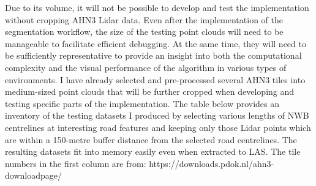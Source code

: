 Due to its volume, it will not be possible to develop and test the implementation without cropping AHN3 Lidar data. Even after the implementation of the segmentation workflow, the size of the testing point clouds will need to be manageable to facilitate efficient debugging. At the same time, they will need to be sufficiently representative to provide an insight into both the computational complexity and the visual performance of the algorithm in various types of environments. I have already selected and pre-processed several AHN3 tiles into medium-sized point clouds that will be further cropped when developing and testing specific parts of the implementation. The table below provides an inventory of the testing datasets I produced by selecting various lengths of NWB centrelines at interesting road features and keeping only those Lidar points which are within a 150-metre buffer distance from the selected road centrelines. The resulting datasets fit into memory easily even when extracted to LAS. The tile numbers in the first column are from: https://downloads.pdok.nl/ahn3-downloadpage/

